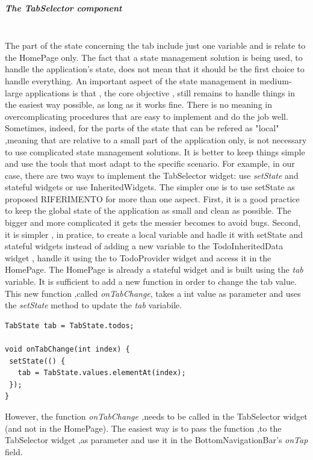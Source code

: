 \subparagraph{The TabSelector component}\mbox{}\\
\label{subpar:todo_app_inherited_widget_tabselector_component}
The part of the state concerning the tab include just one variable and is relate to the HomePage only. The fact that a state management solution is being used, to handle the application's state, does not mean that it should be the first choice to handle everything. An important aspect of the state management in medium-large applications is that , the core objective , still remains to handle things in the easiest way possible, as long as it works fine. There is no meaning in overcomplicating procedures that are easy to implement and do the job well. Sometimes, indeed, for the parts of the state that can be refered as "local" ,meaning that are relative to a small part of the application only, is not necessary to use complicated state management solutions. It is better to keep things simple and use the tools that most adapt to the specific scenario.
For example, in our case, there are two ways to implement the TabSelector widget: use \textit{setState} and stateful widgets or use InheritedWidgets. The simpler one is to use setState as proposed RIFERIMENTO for more than one aspect. First, it is a good practice to keep the global state of the application as small and clean as possible. The bigger and more complicated it gets the messier becomes to avoid bugs. Second, it is simpler , in pratice, to create a local variable and hadle it with setState and stateful widgets instead of adding a new variable to the TodoInheritedData widget , handle it using the to TodoProvider widget and  access it in the HomePage. The HomePage is already a stateful widget and is built using the \textit{tab }variable. It is sufficient to add a new function in order to change the tab value. This new function ,called \textit{onTabChange}, takes a int value as parameter and uses the \textit{setState} method to update the \textit{tab} variabile.
\mbox{}\\


\begin{verbatim}
TabState tab = TabState.todos;

void onTabChange(int index) {
 setState(() {
   tab = TabState.values.elementAt(index);
 });
}
\end{verbatim}
 However, the function  \textit{onTabChange ,}needs to be called in the TabSelector widget (and not in the HomePage). The easiest way is to pass the function ,to the TabSelector widget ,as parameter and use it in the BottomNavigationBar's \textit{onTap }field.


